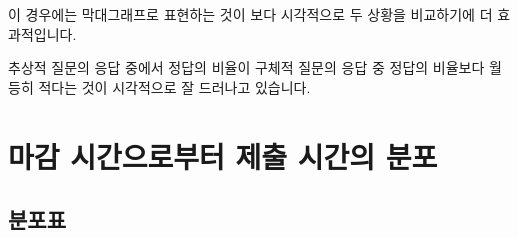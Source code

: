 \documentclass[
]{book}
\begin{document}
이 경우에는 막대그래프로 표현하는 것이 보다 시각적으로 두 상황을 비교하기에 더 효과적입니다.

추상적 질문의 응답 중에서 정답의 비율이 구체적 질문의 응답 중 정답의 비율보다 월등히 적다는 것이 시각적으로 잘 드러나고 있습니다.

\section{마감 시간으로부터 제출 시간의 분포}\label{uxb9c8uxac10-uxc2dcuxac04uxc73cuxb85cuxbd80uxd130-uxc81cuxcd9c-uxc2dcuxac04uxc758-uxbd84uxd3ec-6}

\subsection{분포표}\label{uxbd84uxd3ecuxd45c-7}
\end{document}
